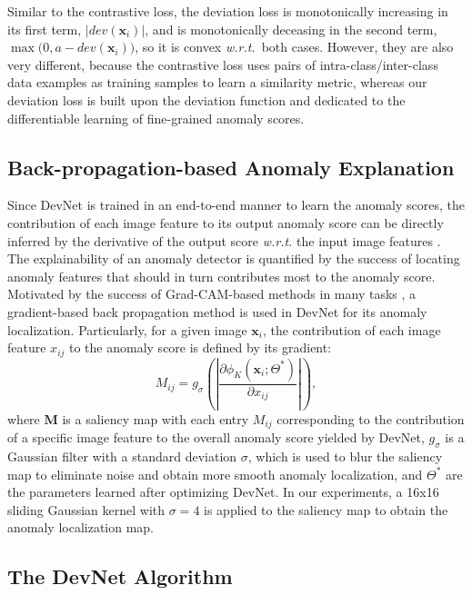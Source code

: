 \documentclass[10pt,journal,compsoc]{IEEEtran}
\begin{document}
Similar to the contrastive loss, the deviation loss is monotonically increasing in its first term, $|\mathit{dev}(\mathbf{x}_{i})|$, and is monotonically deceasing in the second term, $\max\big(0, a - \mathit{dev}(\mathbf{x}_{i})\big)$, so it is convex \textit{w.r.t.}\   both cases. However, they are also very different, because the contrastive loss uses pairs of intra-class/inter-class data examples as training samples to learn a similarity metric, whereas our deviation loss is built upon the deviation function and dedicated to the differentiable learning of fine-grained anomaly scores.



\subsection{Back-propagation-based Anomaly Explanation}\label{subsec:explanation_method} 

Since DevNet is trained in an end-to-end manner to learn the anomaly scores, the contribution of each image feature to its output anomaly score can be directly inferred by the derivative of the output score \textit{w.r.t.} the input image features \cite{selvaraju2017grad}. The explainability of an anomaly detector is quantified by the success of locating anomaly features that should in turn contributes most to the anomaly score. 
Motivated by the success of Grad-CAM-based methods in many tasks \cite{du2019techniques}, a gradient-based back propagation method is used in DevNet for its anomaly localization. Particularly, for a given image $\mathbf{x}_i$, the contribution of each image feature $x_{ij}$ to the anomaly score is defined by its gradient:
\begin{equation}\label{eqn:localization}
M_{ij}=g_\sigma (\left | \frac{\partial \phi_{K}(\mathbf{x}_i;\Theta^*)}{\partial x_{ij}} \right |),
\end{equation}
where $\mathbf{M}$ is a saliency map with each entry $M_{ij}$ corresponding to the contribution of a specific image feature to the overall anomaly score yielded by DevNet, $g_{\sigma}$ is a Gaussian filter with a standard deviation $\sigma$, which is used to blur the saliency map to eliminate noise and obtain more smooth anomaly localization, and $\Theta^*$ are the parameters learned after optimizing DevNet. In our experiments, a 16x16 sliding Gaussian kernel with $\sigma=4$ is applied to the saliency map to obtain the anomaly localization map.


\subsection{The DevNet Algorithm}\label{subsec:algo}
\end{document}
